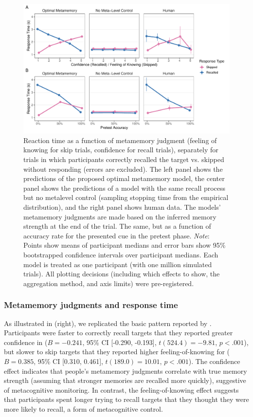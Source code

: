 \begin{figure}[t!]
  \includegraphics[scale=.65]{figs/memory/exp1/rt.pdf}
  \caption{%
     Reaction time as a function of metamemory judgment (feeling of knowing for skip trials, confidence for recall trials), separately for trials in which participants correctly recalled the target vs. skipped without responding (errors are excluded). The left panel shows the predictions of the proposed optimal metamemory model, the center panel shows the predictions of a model with the same recall process but no metalevel control (sampling stopping time from the empirical distribution), and the right panel shows human data. The models' metamemory judgments are made based on the inferred memory strength at the end of the trial.
     The same, but as a function of accuracy rate for the presented cue in the pretest phase. 
    \emph{Note}: Points show means of participant medians and error bars show 95\% bootstrapped confidence intervals over participant medians. Each model is treated as one participant (with one million simulated trials). All plotting decisions (including which effects to show, the aggregation method, and axis limits) were pre-registered.
  }
  \label{fig:exp1_rt}
\end{figure}

\subsubsection{Metamemory judgments and response time}

As illustrated in  (right), we replicated the basic pattern reported by \citet{costermans1992confidence}. Participants were faster to correctly recall targets that they reported greater confidence in ($B = -0.241$, 95\% CI [-0.290, -0.193], $t(524.4)=-9.81$, $p < .001$), but slower to skip targets that they reported higher feeling-of-knowing for ($B = 0.385$, 95\% CI [0.310, 0.461], $t(189.0)=10.01$, $p < .001$). The confidence effect indicates that people's metamemory judgments correlate with true memory strength (assuming that stronger memories are recalled more quickly), suggestive of metacognitive monitoring. In contrast, the feeling-of-knowing effect suggests that participants spent longer trying to recall targets that they thought they were more likely to recall, a form of metacognitive control.

